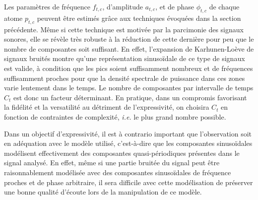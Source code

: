 Les paramètres de fréquence $f_{t, c}$, d'amplitude $a_{t, c}$, et de phase $\phi_{t, c}$ de chaque atome $p_{t, c}$ peuvent être estimés grâce aux techniques évoquées dans la section précédente. Même si cette technique est motivée par la parcimonie des signaux sonores, elle se révèle très robuste à la réduction de cette dernière pour peu que le nombre de composantes soit suffisant. En effet, l'expansion de Karhunen-Lo\`eve de signaux bruités montre qu'une représentation sinusoïdale de ce type de signaux est valide, à condition que les pics soient suffisamment nombreux et de fréquences suffisamment proches pour que la densité spectrale de puissance dans ces zones varie lentement dans le temps. Le nombre de composantes par intervalle de temps $C_t$ est donc un facteur déterminant. En pratique, dans un compromis favorisant la fidélité et la versatilité au détriment de l'expressivité, on choisira $C_t$ en fonction de contraintes de complexité, \textit{i.e.} le plus grand nombre possible.




Dans un objectif d'expressivité, il est à contrario important que l'observation  soit en adéquation avec le modèle utilisé, c'est-à-dire que les composantes sinusoïdales modélisent effectivement des composantes quasi-périodiques présentes dans le signal analysé. En effet, même si une partie bruitée du signal peut être raisonnablement modélisée avec des composantes sinusoïdales de fréquence proches et de phase arbitraire, il sera difficile avec cette modélisation de préserver une bonne qualité d'écoute lors de la manipulation de ce modèle.

